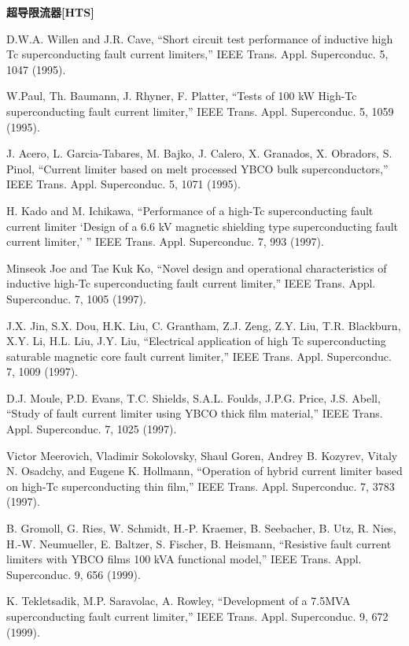 \noindent \textbf{超导限流器[HTS] }

\noindent [9.116] D.W.A. Willen and J.R. Cave, ``Short circuit test performance of inductive high
Tc superconducting fault current limiters,” IEEE Trans. Appl. Superconduc. 5,
1047 (1995).

\noindent [9.117] W.Paul, Th. Baumann, J. Rhyner, F. Platter, ``Tests of 100 kW High-Tc superconducting
fault current limiter,” IEEE Trans. Appl. Superconduc. 5, 1059 (1995).

\noindent [9.118] J. Acero, L. Garcia-Tabares, M. Bajko, J. Calero, X. Granados, X. Obradors,
S. Pinol, ``Current limiter based on melt processed YBCO bulk superconductors,”
IEEE Trans. Appl. Superconduc. 5, 1071 (1995).

\noindent [9.119] H. Kado and M. Ichikawa, ``Performance of a high-Tc superconducting fault current
limiter ‘Design of a 6.6 kV magnetic shielding type superconducting fault
current limiter,’ ” IEEE Trans. Appl. Superconduc. 7, 993 (1997).

\noindent [9.120] Minseok Joe and Tae Kuk Ko, ``Novel design and operational characteristics of
inductive high-Tc superconducting fault current limiter,” IEEE Trans. Appl. Superconduc.
7, 1005 (1997).

\noindent [9.121] J.X. Jin, S.X. Dou, H.K. Liu, C. Grantham, Z.J. Zeng, Z.Y. Liu, T.R. Blackburn,
X.Y. Li, H.L. Liu, J.Y. Liu, ``Electrical application of high Tc superconducting
saturable magnetic core fault current limiter,” IEEE Trans. Appl. Superconduc.
7, 1009 (1997).

\noindent [9.122] D.J. Moule, P.D. Evans, T.C. Shields, S.A.L. Foulds, J.P.G. Price, J.S. Abell,
``Study of fault current limiter using YBCO thick film material,” IEEE Trans.
Appl. Superconduc. 7, 1025 (1997).

\noindent [9.123] Victor Meerovich, Vladimir Sokolovsky, Shaul Goren, Andrey B. Kozyrev, Vitaly
N. Osadchy, and Eugene K. Hollmann, ``Operation of hybrid current limiter based
on high-Tc superconducting thin film,” IEEE Trans. Appl. Superconduc. 7, 3783
(1997).

\noindent [9.124] B. Gromoll, G. Ries, W. Schmidt, H.-P. Kraemer, B. Seebacher, B. Utz, R. Nies,
H.-W. Neumueller, E. Baltzer, S. Fischer, B. Heismann, ``Resistive fault current
limiters with YBCO films 100 kVA functional model,” IEEE Trans. Appl. Superconduc.
9, 656 (1999).

\noindent [9.125] K. Tekletsadik, M.P. Saravolac, A. Rowley, ``Development of a 7.5MVA superconducting
fault current limiter,” IEEE Trans. Appl. Superconduc. 9, 672 (1999).

